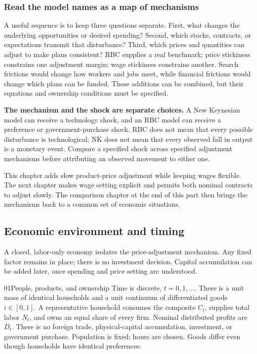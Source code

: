 \subsubsection{Read the model names as a map of mechanisms}

A useful sequence is to keep three questions separate. First, what changes
the underlying opportunities or desired spending? Second, which stocks,
contracts, or expectations transmit that disturbance? Third, which prices and
quantities can adjust to make plans consistent? RBC supplies a real benchmark;
price stickiness constrains one adjustment margin; wage stickiness constrains
another. Search frictions would change how workers and jobs meet, while
financial frictions would change which plans can be funded. These additions
can be combined, but their equations and ownership conditions must be specified.

\begin{blueblock}
\textbf{The mechanism and the shock are separate choices.}
A New Keynesian model can receive a technology shock, and an RBC model can
receive a preference or government-purchase shock. RBC does not mean that every
possible disturbance is technological; NK does not mean that every observed
fall in output is a monetary event. Compare a specified shock across specified
adjustment mechanisms before attributing an observed movement to either one.
\end{blueblock}

This chapter adds slow product-price adjustment while keeping wages flexible.
The next chapter makes wage setting explicit and permits both nominal contracts
to adjust slowly. The comparison chapter at the end of this part then brings
the mechanisms back to a common set of economic situations.

\subsection{Economic environment and timing}

A closed, labor-only economy isolates the price-adjustment mechanism. Any fixed
factor remains in place; there is no investment decision. Capital accumulation
can be added later, once spending and price setting are understood.

\begin{modelsetup}[1]
\begin{modelcondition}{01}{People, products, and ownership}
Time is discrete, $t=0,1,\ldots$. There is a unit mass of identical households
and a unit continuum of differentiated goods $i\in[0,1]$. A representative
household consumes the composite $C_t$, supplies total labor $N_t$, and owns an
equal share of every firm. Nominal distributed profits are $D_t$. There is no
foreign trade, physical-capital accumulation, investment, or government purchase.
Population is fixed; hours are chosen. Goods differ even though households
have identical preferences.
\end{modelcondition}
\end{modelsetup}

